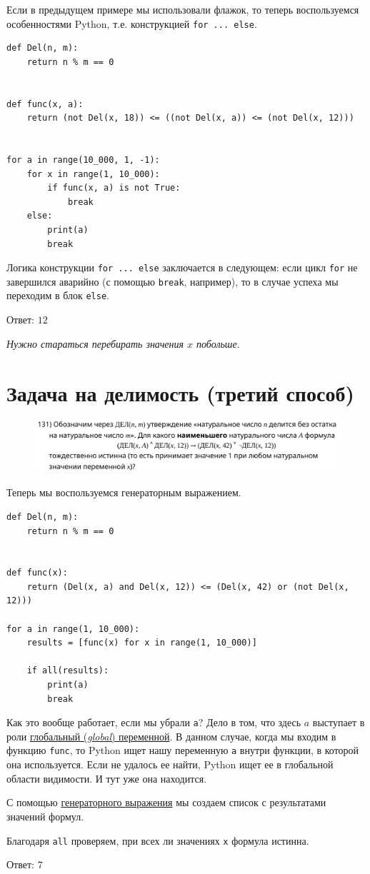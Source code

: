 \documentclass[14pt]{extreport}
\begin{document}
Если в предыдущем примере мы использовали флажок, то теперь воспользуемся особенностями Python, т.е. конструкцией \texttt{for ... else}.

\begin{verbatim}
def Del(n, m):
    return n % m == 0


def func(x, a):
    return (not Del(x, 18)) <= ((not Del(x, a)) <= (not Del(x, 12)))


for a in range(10_000, 1, -1):
    for x in range(1, 10_000):
        if func(x, a) is not True:
            break
    else:
        print(a)
        break
\end{verbatim}

Логика конструкции \texttt{for ... else} заключается в следующем: если цикл \texttt{for} не завершился аварийно (с помощью \texttt{break}, например), то в случае успеха мы переходим в блок \texttt{else}.

Ответ: $\boxed{12}$

\textit{Нужно стараться перебирать значения $x$ побольше}.

\newpage
\section{Задача на делимость (третий способ)}
\begin{figure}[h]
    \includegraphics[width=\textwidth]{131-polyakov.png}
\end{figure}

Теперь мы воспользуемся генераторным выражением.

\begin{verbatim}
def Del(n, m):
    return n % m == 0


def func(x):
    return (Del(x, a) and Del(x, 12)) <= (Del(x, 42) or (not Del(x, 12)))

for a in range(1, 10_000):
    results = [func(x) for x in range(1, 10_000)]

    if all(results):
        print(a)
        break
\end{verbatim}

Как это вообще работает, если мы убрали \texttt{a}? Дело в том, что здесь $a$ выступает в роли \href{https://docs.python.org/3/faq/programming.html#what-are-the-rules-for-local-and-global-variables-in-python}{глобальный (\textit{global}) переменной}. В данном случае, когда мы входим в функцию \texttt{func}, то Python ищет нашу переменную \texttt{a} внутри функции, в которой она используется. Если не удалось ее найти, Python ищет ее в глобальной области видимости. И тут уже она находится.

С помощью \href{https://peps.python.org/pep-0289/}{генераторного выражения} мы создаем список с результатами значений формул.

Благодаря \texttt{all} проверяем, при всех ли значениях \texttt{x} формула истинна.

Ответ: $\boxed{7}$
\end{document}
